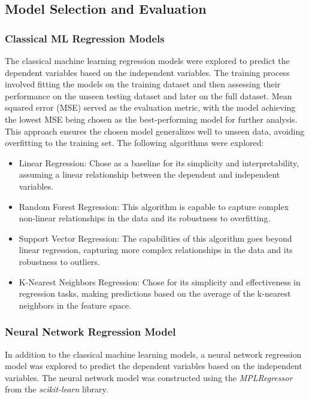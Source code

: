 \subsection{Model Selection and Evaluation}
\subsubsection{Classical ML Regression Models}
The classical machine learning regression models were explored to predict the dependent variables based on the independent variables.
The training process involved fitting the models on the training dataset and then assessing their performance on the unseen testing dataset and later on the full dataset.
Mean squared error (MSE) served as the evaluation metric,
with the model achieving the lowest MSE being chosen as the best-performing model for further analysis. This approach ensures the chosen model generalizes well to unseen data, avoiding
overfitting to the training set. The following algorithms were explored:
\begin{itemize}
    \item Linear Regression: Chose as a baseline for its simplicity and interpretability, assuming a linear relationship between the dependent and independent variables. \cite{poole1971assumptions}
    \item Random Forest Regression: This algorithm is capable to capture complex non-linear relationships in the data and its robustness to overfitting. \cite{liu2012new}
    \item Support Vector Regression: The capabilities of this algorithm goes beyond linear regression, capturing more complex relationships in the data and its robustness to outliers. \cite{mangasarian2000robust}
    \item K-Nearest Neighbors Regression: Chose for its simplicity and effectiveness in regression tasks, making predictions based on the average of the k-nearest neighbors in the feature space. \cite{song2017efficient}
\end{itemize}

\subsubsection{Neural Network Regression Model}

In addition to the classical machine learning models, a neural network regression model was explored to predict the dependent variables based on the independent variables. The neural network model was
constructed using the \textit{MPLRegressor} from the \textit{scikit-learn} library.

